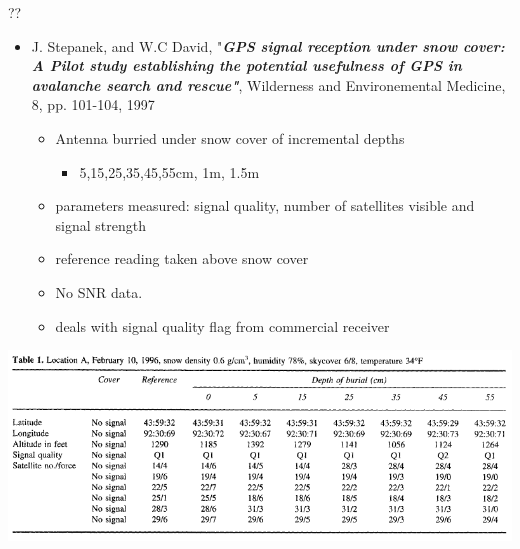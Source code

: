 \documentclass{beamer}
\begin{document}
\begin{frame}{??}
  \begin{itemize}
  \item J. Stepanek, and W.C David, "\emph{\bf GPS signal reception under snow cover: A Pilot study establishing the potential usefulness of GPS in avalanche search and rescue"}, Wilderness and Environemental Medicine, 8, pp. 101-104, 1997
    \begin{itemize}
    \item Antenna burried under snow cover of incremental depths
      \begin{itemize}
         \item 5,15,25,35,45,55cm, 1m, 1.5m
      \end{itemize}
    \item parameters measured: signal quality, number of satellites visible and signal strength
    \item reference reading taken above snow cover
    \item No SNR data.
    \item deals with signal quality flag from commercial receiver
    \end{itemize}
  \end{itemize}

\end{frame}

\begin{frame}
  \includegraphics[width=1\linewidth,clip=true]{paper_snow_cover_tbl1.png}
\end{frame}


\end{document}
